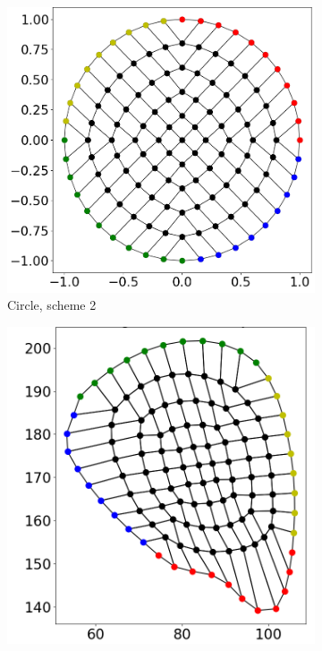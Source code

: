 \begin{figure}
  \begin{subfigure}[t]{0.24\textwidth}%
    \centering%
    \includegraphics[width=\textwidth]{images/fiber_creation/quad_3.png}%
    \caption{Circle, scheme 2}%
    \label{fig:lquad_3}%
  \end{subfigure}
  \begin{subfigure}[t]{0.24\textwidth}%
    \centering%
    \includegraphics[width=\textwidth, trim=30mm 14mm 6mm 6mm, clip]{images/fiber_creation/mesh_plots/out_0_3_0_w.png}%

\end{subfigure}
\end{figure}
